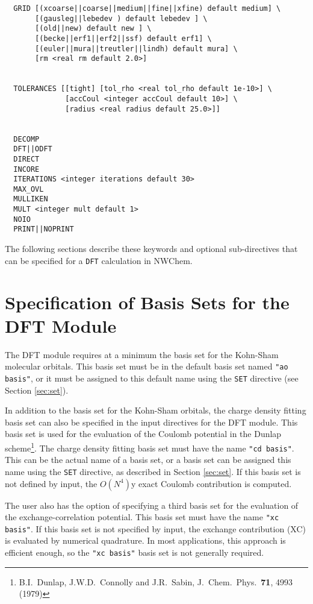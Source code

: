 \begin{verbatim}
  GRID [(xcoarse||coarse||medium||fine||xfine) default medium] \
       [(gausleg||lebedev ) default lebedev ] \
       [(old||new) default new ] \
       [(becke||erf1||erf2||ssf) default erf1] \
       [(euler||mura||treutler||lindh) default mura] \
       [rm <real rm default 2.0>]
        

  TOLERANCES [[tight] [tol_rho <real tol_rho default 1e-10>] \
              [accCoul <integer accCoul default 10>] \
              [radius <real radius default 25.0>]]


  DECOMP
  DFT||ODFT
  DIRECT
  INCORE
  ITERATIONS <integer iterations default 30>
  MAX_OVL
  MULLIKEN
  MULT <integer mult default 1>
  NOIO
  PRINT||NOPRINT
\end{verbatim}

The following 
sections describe these keywords and
optional sub-directives that can be specified for a \verb+DFT+ calculation
in NWChem.

\section{Specification of Basis Sets for the DFT Module}

The DFT module requires at a minimum the basis set for the Kohn-Sham 
molecular orbitals.  This basis set must be in the default basis set named
{\tt "ao basis"}, or it must be assigned to this default name using the
\verb+SET+ directive (see Section \ref{sec:set}).

In addition to the basis set for the Kohn-Sham orbitals, 
the charge density fitting basis set can also be specified in the 
input directives for the DFT module.  This basis set is used for the 
evaluation of the Coulomb potential in the Dunlap scheme\footnote{B.I.~Dunlap, 
J.W.D.~Connolly and J.R.~Sabin, J.~Chem.~Phys.~{\bf 71},  4993 (1979)}.
The charge density fitting basis set must have the name {\tt "cd basis"}.
This can be the actual name of a basis set, or a basis set can be 
assigned this name using the \verb+SET+ directive, as described in
Section \ref{sec:set}.  If this basis set is not defined by input,
the $O(N^4)$y exact Coulomb contribution is computed.

The user also has the option of specifying a third basis set for the 
evaluation of the exchange-correlation potential.  This basis set must
have the name {\tt "xc basis"}.  If this basis set is not specified
by input, the exchange contribution (XC) is evaluated by numerical
quadrature.  In most applications, this approach is efficient enough,
so the {\tt "xc basis"} basis set is not generally required.

